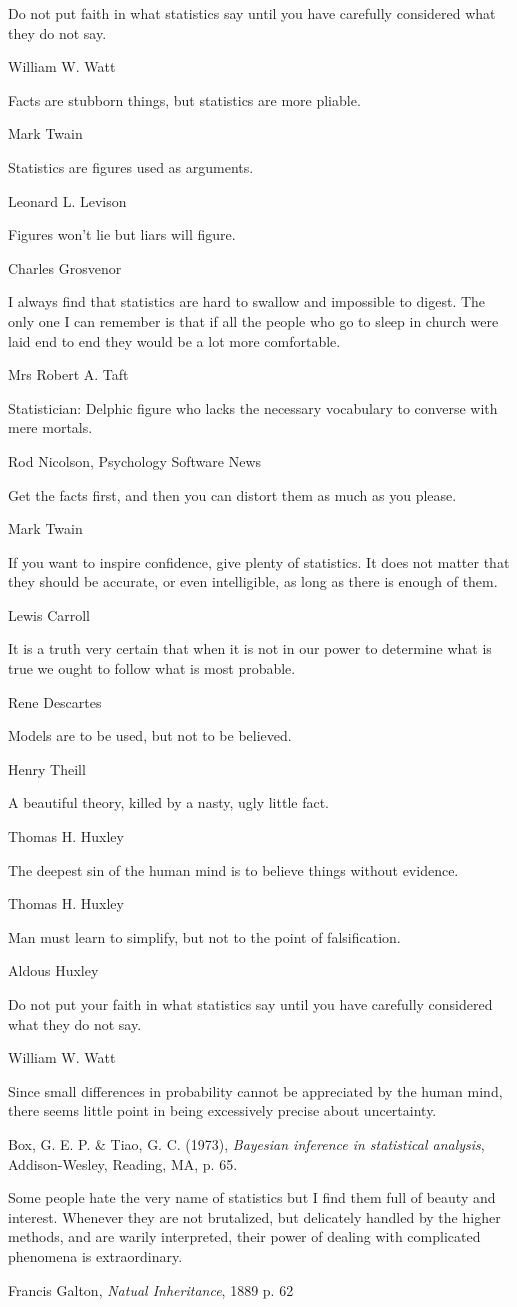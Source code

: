 \epigraph{Do not put faith in what statistics say until you have carefully considered what they do not say.}{William W. Watt}

\epigraph{Facts are stubborn things, but statistics are more pliable.}{Mark Twain}

\epigraph{Statistics are figures used as arguments.}{Leonard L. Levison}

\epigraph{Figures won't lie but liars will figure.}{Charles Grosvenor}

\epigraph{I always find that statistics are hard to swallow and impossible to digest.  The only one I can remember is that if all the people who go to sleep in church were laid end to end they would be a lot more comfortable.}{Mrs Robert A. Taft}

\epigraph{Statistician: Delphic figure who lacks the necessary vocabulary to converse with mere mortals.}{Rod Nicolson, Psychology Software News}

\epigraph{Get the facts first, and then you can distort them as much as you please.}{Mark Twain}

\epigraph{If you want to inspire confidence, give plenty of statistics. It does not matter that they should be accurate, or even intelligible, as long as there is enough of them.}{Lewis Carroll}

\epigraph{It is a truth very certain that when it is not in our power to determine what is true we ought to follow what is most probable.}{Rene Descartes}

\epigraph{Models are to be used, but not to be believed.}{Henry Theill}

\epigraph{A beautiful theory, killed by a nasty, ugly little fact.}{Thomas H. Huxley}

\epigraph{The deepest sin of the human mind is to believe things without evidence.}{Thomas H. Huxley}

\epigraph{Man must learn to simplify, but not to the point of falsification.}{Aldous Huxley}

\epigraph{Do not put your faith in what statistics say until you have carefully considered what they do not say.}{William W. Watt}
	
\epigraph{Since small differences in probability cannot be appreciated by the human mind, there seems little point in being excessively precise about uncertainty.}{Box, G. E. P. \& Tiao, G. C. (1973), \emph{Bayesian inference in statistical analysis}, Addison-Wesley, Reading, MA, p. 65.}

\epigraph{Some people hate the very name of statistics but I find them full of beauty and interest.  Whenever they are not brutalized, but delicately handled by the higher methods, and are warily interpreted,  their power of dealing with complicated phenomena is extraordinary.}{Francis Galton, \emph{Natual Inheritance}, 1889 p. 62}


